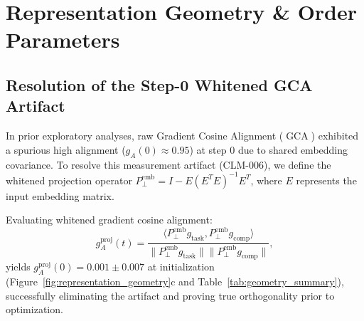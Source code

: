 \documentclass{article}
\theoremstyle{plain}
\theoremstyle{definition}
\DeclareMathOperator{\GCA}{GCA}
\begin{document}
\section{Representation Geometry \& Order Parameters}
\label{sec:representation_geometry}

\subsection{Resolution of the Step-0 Whitened GCA Artifact}
In prior exploratory analyses, raw Gradient Cosine Alignment ($\GCA$) exhibited a spurious high alignment ($g_A(0) \approx 0.95$) at step 0 due to shared embedding covariance. To resolve this measurement artifact (CLM-006), we define the whitened projection operator $P_{\perp}^{\text{emb}} = I - E (E^T E)^{-1} E^T$, where $E$ represents the input embedding matrix.

Evaluating whitened gradient cosine alignment:
\begin{equation}
    g_A^{\text{proj}}(t) = \frac{\langle P_{\perp}^{\text{emb}} g_{\text{task}}, P_{\perp}^{\text{emb}} g_{\text{comp}} \rangle}{\|P_{\perp}^{\text{emb}} g_{\text{task}}\| \|P_{\perp}^{\text{emb}} g_{\text{comp}}\|},
    \label{eq:whitened_gca}
\end{equation}
yields $g_A^{\text{proj}}(0) = 0.001 \pm 0.007$ at initialization (Figure~\ref{fig:representation_geometry}c and Table~\ref{tab:geometry_summary}), successfully eliminating the artifact and proving true orthogonality prior to optimization.

\begin{table}[t]
\centering
\caption{\textbf{Representation Geometry Diagnostics \& Temporal Lead-Lag Analysis.} Layerwise Centered Kernel Alignment (CKA) and whitened Gradient Cosine Alignment (GCA) demonstrate that internal representation alignment precedes behavioral OOD generalization.}
\label{tab:geometry_summary}
\vskip 0.1in
\begin{small}
\begin{sc}
\end{sc}
\end{small}
\end{table}
\end{document}
